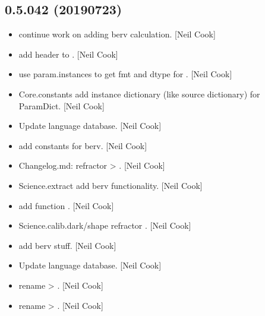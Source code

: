 \documentclass[a4paper,10pt,english]{report}
\begin{document}
\subsection{0.5.042 (2019\sphinxhyphen{}07\sphinxhyphen{}23)}
\label{\detokenize{misc/changelog:id119}}\begin{itemize}
\item {} 
 \sphinxhyphen{} continue work on adding berv calculation.
{[}Neil Cook{]}

\item {} 
 \sphinxhyphen{} add header to . {[}Neil Cook{]}

\item {} 
 \sphinxhyphen{} use param.instances to get fmt and dtype for .
{[}Neil Cook{]}

\item {} 
Core.constants \sphinxhyphen{} add instance dictionary (like source dictionary) for
ParamDict. {[}Neil Cook{]}

\item {} 
Update language database. {[}Neil Cook{]}

\item {} 
 \sphinxhyphen{} add constants for berv. {[}Neil Cook{]}

\item {} 
Changelog.md: refractor  \textendash{}\textgreater{} . {[}Neil Cook{]}

\item {} 
Science.extract \sphinxhyphen{} add berv functionality. {[}Neil Cook{]}

\item {} 
 \sphinxhyphen{} add function . {[}Neil Cook{]}

\item {} 
Science.calib.dark/shape \sphinxhyphen{} refractor .
{[}Neil Cook{]}

\item {} 
 \sphinxhyphen{} add berv stuff. {[}Neil Cook{]}

\item {} 
Update language database. {[}Neil Cook{]}

\item {} 
 \sphinxhyphen{} rename  \textendash{}\textgreater{} . {[}Neil Cook{]}

\item {} 
 \sphinxhyphen{} rename  \textendash{}\textgreater{} . {[}Neil
Cook{]}

\end{itemize}
\end{document}
